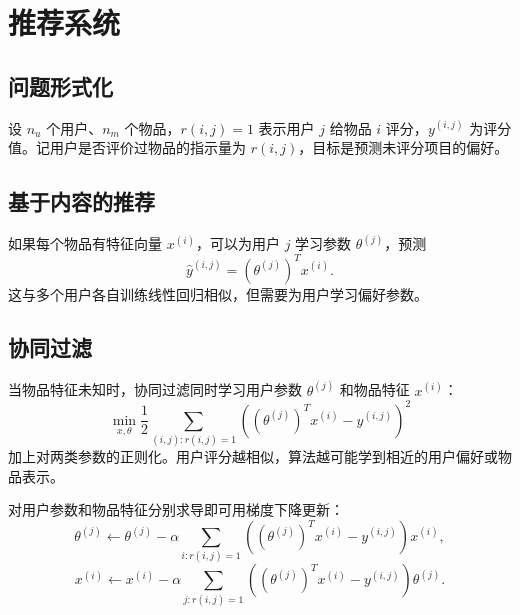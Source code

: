\section{推荐系统}
\subsection{问题形式化}
\begin{definitionbox}[评分矩阵]
设 $n_u$ 个用户、$n_m$ 个物品，$r(i,j)=1$ 表示用户 $j$ 给物品 $i$ 评分，$y^{(i,j)}$ 为评分值。记用户是否评价过物品的指示量为 $r(i,j)$，目标是预测未评分项目的偏好。
\end{definitionbox}
\subsection{基于内容的推荐}
\begin{keybox}[用户和物品特征]
如果每个物品有特征向量 $x^{(i)}$，可以为用户 $j$ 学习参数 $\theta^{(j)}$，预测
\[
\hat y^{(i,j)}=(\theta^{(j)})^Tx^{(i)}.
\]
这与多个用户各自训练线性回归相似，但需要为用户学习偏好参数。
\end{keybox}
\subsection{协同过滤}
\begin{definitionbox}[同时学习两类参数]
当物品特征未知时，协同过滤同时学习用户参数 $\theta^{(j)}$ 和物品特征 $x^{(i)}$：
\[
\min_{x,\theta}\frac12\sum_{(i,j):r(i,j)=1}
\left((\theta^{(j)})^Tx^{(i)}-y^{(i,j)}\right)^2
\]
加上对两类参数的正则化。用户评分越相似，算法越可能学到相近的用户偏好或物品表示。
\end{definitionbox}
\begin{keybox}[协同过滤的梯度]
对用户参数和物品特征分别求导即可用梯度下降更新：
\[
\theta^{(j)}\leftarrow\theta^{(j)}-\alpha\sum_{i:r(i,j)=1}
\left((\theta^{(j)})^Tx^{(i)}-y^{(i,j)}\right)x^{(i)},
\]
\[
x^{(i)}\leftarrow x^{(i)}-\alpha\sum_{j:r(i,j)=1}
\left((\theta^{(j)})^Tx^{(i)}-y^{(i,j)}\right)\theta^{(j)}.
\]
\end{keybox}

